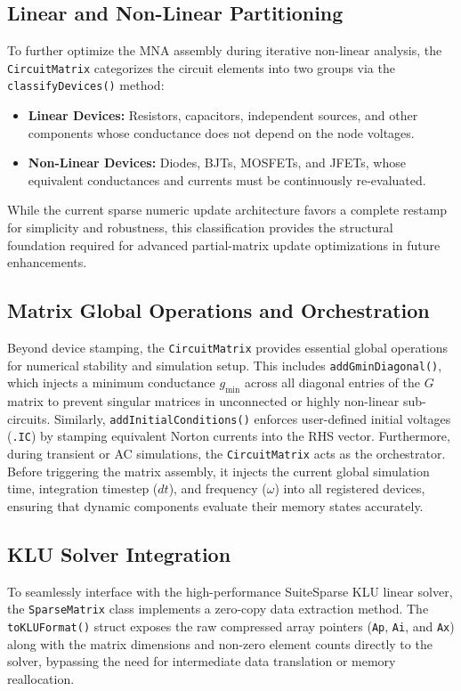 \subsection{Linear and Non-Linear Partitioning}
To further optimize the MNA assembly during iterative non-linear analysis, the \texttt{CircuitMatrix} categorizes the circuit elements into two groups via the \texttt{classifyDevices()} method:
\begin{itemize}
    \item \textbf{Linear Devices:} Resistors, capacitors, independent sources, and other components whose conductance does not depend on the node voltages.
    \item \textbf{Non-Linear Devices:} Diodes, BJTs, MOSFETs, and JFETs, whose equivalent conductances and currents must be continuously re-evaluated.
\end{itemize}
While the current sparse numeric update architecture favors a complete restamp for simplicity and robustness, this classification provides the structural foundation required for advanced partial-matrix update optimizations in future enhancements.

\subsection{Matrix Global Operations and Orchestration}
Beyond device stamping, the \texttt{CircuitMatrix} provides essential global operations for numerical stability and simulation setup. This includes \texttt{addGminDiagonal()}, which injects a minimum conductance $g_{\text{min}}$ across all diagonal entries of the $G$ matrix to prevent singular matrices in unconnected or highly non-linear sub-circuits. Similarly, \texttt{addInitialConditions()} enforces user-defined initial voltages (\texttt{.IC}) by stamping equivalent Norton currents into the RHS vector.
Furthermore, during transient or AC simulations, the \texttt{CircuitMatrix} acts as the orchestrator. Before triggering the matrix assembly, it injects the current global simulation time, integration timestep ($dt$), and frequency ($\omega$) into all registered devices, ensuring that dynamic components evaluate their memory states accurately.

\subsection{KLU Solver Integration}
To seamlessly interface with the high-performance SuiteSparse KLU linear solver, the \texttt{SparseMatrix} class implements a zero-copy data extraction method. The \texttt{toKLUFormat()} struct exposes the raw compressed array pointers (\texttt{Ap}, \texttt{Ai}, and \texttt{Ax}) along with the matrix dimensions and non-zero element counts directly to the solver, bypassing the need for intermediate data translation or memory reallocation.

